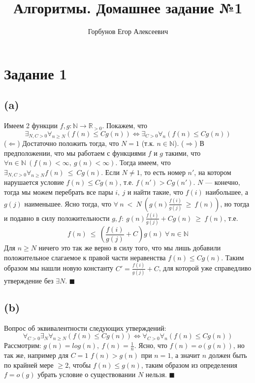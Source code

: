 \documentclass[12pt, a4paper]{article}
\title{Алгоритмы. Домашнее задание №1}
\author{Горбунов Егор Алексеевич}
\newcommand{\task}[1]{\section*{Задание #1}}
\newcommand{\subtask}[1]{\subsection*{#1}}
\begin{document}
\maketitle
\task{1}
\subtask{(a)}
Имеем 2 функции $f, g: \mathbb{N} \rightarrow \mathbb{R}_{>0}$. Покажем, что
\[ 
	\exists_{N, C > 0}{ \forall_{n \geq N}{(f(n) \leq C g(n))}} \iff \exists_{C > 0}{ \forall_{n}{(f(n) \leq C g(n))}} 
\]
($\Leftarrow$) Достаточно положить тогда, что $N = 1$ (т.к. $n \in \mathbb{N}$).
($\Rightarrow$) В предположении, что мы работаем с функциями $f$ и $g$ такими, что $\forall n \in \mathbb{N}\
(f(n) < \infty,\ g(n) < \infty)$. Тогда имеем, что $\exists_{N, C > 0}{ \forall_{n \geq N}{f(n)~\leq~Cg(n)}}$.
Если $N \neq 1$, то есть номер $n'$, на котором нарушается условие $f(n) \leq Cg(n)$, т.е. $f(n') > Cg(n')$. 
$N$ --- конечно, тогда мы можем перебрать все пары $i,\ j$ и найти такие, что $f(i)$ наибольшее, а $g(j)$ наименьшее.
Ясно тогда, что $\forall~n~<~N\ (g(n)\frac{f(i)}{g(j)}~\geq~f(n))$, но тогда и подавно в силу положительности 
$g, f:\ g(n)\frac{f(i)}{g(j)}+Cg(n)~\geq~f(n)$, т.е.
\[ f(n)~\leq~(\frac{f(i)}{g(j)}+C)g(n)~\forall~n\in\mathbb{N} \]
Для $n \geq N$ ничего это так же верно в силу того, что мы лишь добавили положительное слагаемое к правой части неравенства
$f(n) \leq Cg(n)$. Таким образом мы нашли новую константу $C' = \frac{f(i)}{g(j)}+C$, для которой уже справедливо утверждение
без $\exists N$. \hfill $\blacksquare$
\subtask{(b)} Вопрос об эквивалентности следующих утверждений:
\[ 
	\forall_{C>0}{\exists_{N}}{\forall_{n\geq N}{(f(n) \leq C g(n))}} \iff \forall_{C>0}{\forall_{n}{(f(n) \leq C g(n))}}
\]
Рассмотрим: $g(n)=log(n),\ f(n)=\frac{1}{n}$. Ясно, что $f(n)=o(g(n))$, но так же, например для $C=1$ $f(n)>g(n)$ при 
$n=1$, а значит $n$ должен быть по крайней мере $\geq 2$, чтобы $f(n)\leq g(n)$, таким образом из определения $f=o(g)$
убрать условие о существовании $N$ нельзя. \hfill $\blacksquare$
\end{document}
